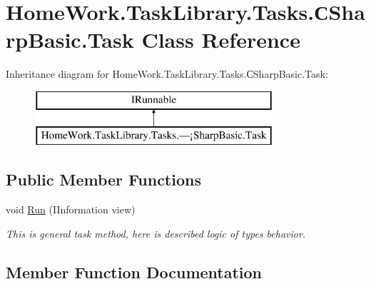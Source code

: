 \hypertarget{class_home_work_1_1_task_library_1_1_tasks_1_1_xD0_xA1_sharp_basic_1_1_task}{}\section{Home\+Work.\+Task\+Library.\+Tasks.\+С\+Sharp\+Basic.\+Task Class Reference}
\label{class_home_work_1_1_task_library_1_1_tasks_1_1_xD0_xA1_sharp_basic_1_1_task}
Inheritance diagram for Home\+Work.\+Task\+Library.\+Tasks.\+С\+Sharp\+Basic.\+Task\+:\begin{figure}[H]
\begin{center}
\leavevmode
\includegraphics[height=2.000000cm]{class_home_work_1_1_task_library_1_1_tasks_1_1_xD0_xA1_sharp_basic_1_1_task}
\end{center}
\end{figure}
\subsection*{Public Member Functions}
\begin{DoxyCompactItemize}
\item 
void \mbox{\hyperlink{class_home_work_1_1_task_library_1_1_tasks_1_1_xD0_xA1_sharp_basic_1_1_task_a83153a1ae3c32a46f6066b50a8a3f27c}{Run}} (I\+Information view)
\begin{DoxyCompactList}\small\item\em This is general task method, here is described logic of types behavior. \end{DoxyCompactList}\end{DoxyCompactItemize}


\subsection{Member Function Documentation}
\mbox{\label{class_home_work_1_1_task_library_1_1_tasks_1_1_xD0_xA1_sharp_basic_1_1_task_a83153a1ae3c32a46f6066b50a8a3f27c}} 
